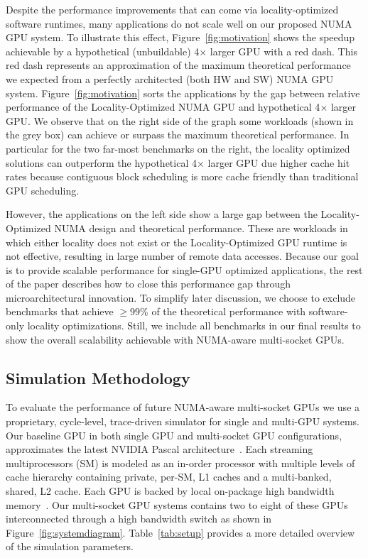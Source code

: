 Despite the performance improvements that can come via locality-optimized 
software runtimes, many applications do not scale well on our proposed NUMA 
GPU system. To illustrate this effect, Figure~\ref{fig:motivation} shows the speedup 
achievable by a hypothetical (unbuildable) 4$\times$ larger GPU with 
a red dash. This red dash represents an approximation of the 
maximum theoretical performance we expected from a perfectly architected 
(both HW and SW) NUMA GPU system. Figure~\ref{fig:motivation} sorts the 
applications by the gap between relative performance of the Locality-Optimized 
NUMA GPU and hypothetical 4$\times$ larger GPU. We observe that on the right 
side of the graph some workloads (shown in the grey box) can achieve or surpass 
the maximum theoretical performance. In particular for the two far-most 
benchmarks on the right, the locality optimized solutions can outperform the 
hypothetical 4$\times$ larger GPU due higher cache hit rates because contiguous block 
scheduling is more cache friendly than traditional GPU scheduling.

However, the applications on the left side show a large gap between the 
Locality-Optimized NUMA design and theoretical performance. These are workloads 
in which either locality does not exist or the Locality-Optimized GPU runtime is 
not effective, resulting in large number of remote data accesses. Because our goal is to provide scalable performance for single-GPU 
optimized applications, the rest of the paper describes how to close this 
performance gap through microarchitectural innovation. To simplify later 
discussion, we choose to exclude benchmarks that achieve $\geq$99\% of the 
theoretical performance with software-only locality optimizations. Still, we include 
all benchmarks in our final results to show the overall scalability 
achievable with NUMA-aware multi-socket GPUs.
 
\subsection{Simulation Methodology}
\label{sec:methodology}

To evaluate the performance of future NUMA-aware multi-socket GPUs we use a 
proprietary, cycle-level, trace-driven simulator for single and multi-GPU 
systems. Our baseline GPU in both single GPU and multi-socket GPU 
configurations, approximates the latest NVIDIA Pascal 
architecture~\cite{pascal-tesla-wp}. Each streaming multiprocessors (SM) is 
modeled as an in-order processor with multiple levels of cache hierarchy 
containing private, per-SM, L1 caches and a multi-banked, shared, L2 cache. Each 
GPU is backed by local on-package high bandwidth memory~\cite{HBM}. Our 
multi-socket GPU systems contains two to eight of these GPUs interconnected 
through a high bandwidth switch as shown in Figure~\ref{fig:systemdiagram}. 
Table~\ref{tab:setup} provides a more detailed overview of the simulation 
parameters.


